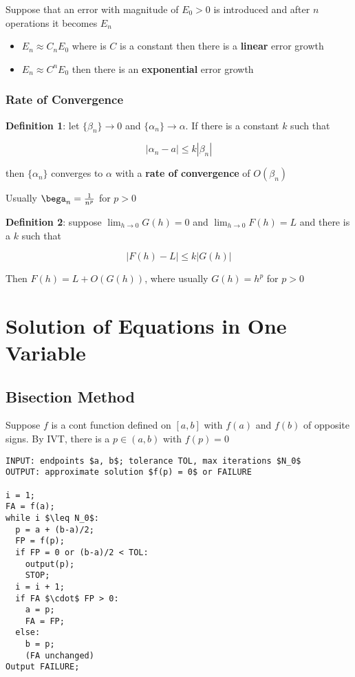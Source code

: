 \documentclass{article}
\begin{document}
  Suppose that an error with magnitude of $E_0 > 0$ is introduced and after $n$ operations it becomes $E_n$
  \begin{itemize}
    \item $E_n \approx C_n E_0$ where is $C$ is a constant then there is a \textbf{linear} error growth
    \item $E_n \approx C^n E_0$ then there is an \textbf{exponential} error growth
  \end{itemize}
  \subsubsection{Rate of Convergence}

  \textbf{Definition 1}: let $\{\beta_n\} \rightarrow 0$ and $\{\alpha_n\} \rightarrow \alpha$. If there is a constant $k$ such that

  \[|\alpha_n - a| \leq k | \beta_n|\]

  then $\{\alpha_n\}$ converges to $\alpha$ with a \textbf{rate of convergence} of $O(\beta_n)$

  Usually $\bega_n = \frac{1}{n^p}$ for $p > 0$

  \textbf{Definition 2}: suppose $\lim_{h \rightarrow 0} G(h) = 0$ and $\lim_{h \rightarrow 0} F(h) = L$ and there is a $k$ such that

  \[|F(h) - L| \leq k|G(h)|\]

  Then $F(h) = L + O(G(h))$, where usually $G(h) = h^p$ for $p > 0$

\section{Solution of Equations in One Variable}
\subsection{Bisection Method}
Suppose $f$ is a cont function defined on $[a,b]$ with $f(a)$ and $f(b)$ of opposite signs. By IVT, there is a $p \in (a,b)$ with $f(p) = 0$

\begin{lstlisting}
INPUT: endpoints $a, b$; tolerance TOL, max iterations $N_0$
OUTPUT: approximate solution $f(p) = 0$ or FAILURE

i = 1;
FA = f(a);
while i $\leq N_0$:
  p = a + (b-a)/2; 
  FP = f(p);
  if FP = 0 or (b-a)/2 < TOL:
    output(p);
    STOP;
  i = i + 1;
  if FA $\cdot$ FP > 0:
    a = p;
    FA = FP;
  else:
    b = p;
    (FA unchanged)
Output FAILURE;
\end{lstlisting}
\end{document}
